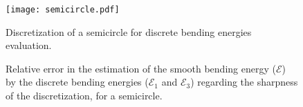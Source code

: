 \begin{figure}[p]
\centering
\captionsetup[subfloat]{captionskip=10pt}
\begin{fullpage}
	\texttt{[image: semicircle.pdf]}
	\caption{Discretization of a semicircle for discrete bending energies evaluation.}
	\label{fig:semicircle}
	\vspace{20mm}
	\Table
	\hspace{5mm}
	\vspace{8pt}
	\caption{Relative error in the estimation of the smooth bending energy ($\mathcal{E}$) by the discrete bending energies ($\mathcal{E}_1$ and $\mathcal{E}_3$) regarding the sharpness of the discretization, for a semicircle.}
	\label{fig:bench_semicircle}
\end{fullpage}
\end{figure}
